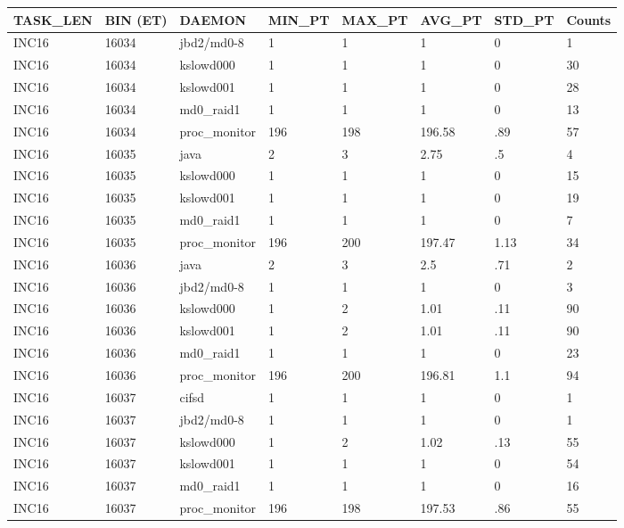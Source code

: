 \begin{table}[h]
\begin{center}
{\scriptsize
\begin{tabular}{l|l|l|l|l|l|l|l} \hline
TASK\_LEN  & BIN (ET) &  DAEMON   & MIN\_PT  &  MAX\_PT  &  AVG\_PT  &   STD\_PT & Counts \\ \hline
INC16     & 16034     & jbd2/md0-8     & 1     & 1     & 1     & 0     & 1\\ \hline
INC16     & 16034     & kslowd000     & 1     & 1     & 1     & 0     & 30\\ \hline
INC16     & 16034     & kslowd001     & 1     & 1     & 1     & 0     & 28\\ \hline
INC16     & 16034     & md0\_raid1     & 1     & 1     & 1     & 0     & 13\\ \hline
INC16     & 16034     & proc\_monitor     & 196     & 198     & 196.58     & .89     & 57\\ \hline \hline

INC16     & 16035     & java     & 2     & 3     & 2.75     & .5     & 4\\ \hline
INC16     & 16035     & kslowd000     & 1     & 1     & 1     & 0     & 15\\ \hline
INC16     & 16035     & kslowd001     & 1     & 1     & 1     & 0     & 19\\ \hline
INC16     & 16035     & md0\_raid1     & 1     & 1     & 1     & 0     & 7\\ \hline
INC16     & 16035     & proc\_monitor     & 196     & 200     & 197.47     & 1.13     & 34\\ \hline \hline

INC16     & 16036     & java     & 2     & 3     & 2.5     & .71     & 2\\ \hline
INC16     & 16036     & jbd2/md0-8     & 1     & 1     & 1     & 0     & 3\\ \hline
INC16     & 16036     & kslowd000     & 1     & 2     & 1.01     & .11     & 90\\ \hline
INC16     & 16036     & kslowd001     & 1     & 2     & 1.01     & .11     & 90\\ \hline
INC16     & 16036     & md0\_raid1     & 1     & 1     & 1     & 0     & 23\\ \hline
INC16     & 16036     & proc\_monitor     & 196     & 200     & 196.81     & 1.1     & 94\\ \hline \hline

INC16     & 16037     & cifsd     & 1     & 1     & 1     & 0     & 1\\ \hline
INC16     & 16037     & jbd2/md0-8     & 1     & 1     & 1     & 0     & 1\\ \hline
INC16     & 16037     & kslowd000     & 1     & 2     & 1.02     & .13     & 55\\ \hline
INC16     & 16037     & kslowd001     & 1     & 1     & 1     & 0     & 54\\ \hline
INC16     & 16037     & md0\_raid1     & 1     & 1     & 1     & 0     & 16\\ \hline
INC16     & 16037     & proc\_monitor     & 196     & 198     & 197.53     & .86     & 55\\ \hline \hline


\end{tabular}}
\end{center}
\end{table}
